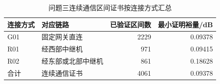 \begin{table}[H]\centering\normalsize
\caption{问题三连续通信区间证书按连接方式汇总}\label{tab:q3_communication}
\begin{tabular}{llrr}
\toprule
连接方式 & 对应链路 & 已验证区间数 & 最小证明裕量/dB\\\midrule
G01 & 固定网关直连 & 2229 & 0.09378\\
R01 & 经西部中继机 & 971 & 0.09415\\
R02 & 经东部或北部中继机 & 861 & 0.18628\\
合计 & 连续通信证书 & 4061 & 0.09378\\
\bottomrule\end{tabular}
\end{table}
